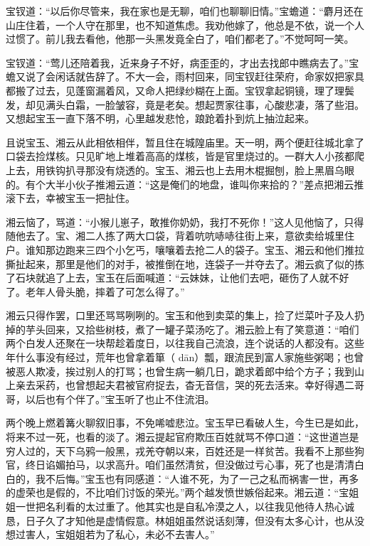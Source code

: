 \documentclass[12pt,oneside]{book}
\begin{document}
宝钗道：“以后你尽管来，我在家也是无聊，咱们也聊聊旧情。”宝蟾道：“麝月还在山庄住着，一个人守在那里，也不知道焦虑。我劝他嫁了，他总是不依，说一个人过惯了。前儿我去看他，他那一头黑发竟全白了，咱们都老了。”不觉呵呵一笑。

宝钗道：“莺儿还陪着我，近来身子不好，病歪歪的，才出去找郎中瞧病去了。”宝蟾又说了会闲话就告辞了。不大一会，雨村回来，同宝钗赶往荣府，命家奴把家具都搬了过去，见蓬窗漏着风，又命人把绿纱糊在上面。宝钗拿起铜镜，理了理鬓发，却见满头白霜，一脸皱容，竟是老矣。想起贾家往事，心酸悲凄，落了些泪。又想起宝玉一直下落不明，心里越发悲怆，踉跄着扑到炕上抽泣起来。

且说宝玉、湘云从此相依相伴，暂且住在城隍庙里。天一明，两个便赶往城北拿了口袋去捡煤核。只见旷地上堆着高高的煤核，皆是官里烧过的。一群大人小孩都爬上去，用铁钩扒寻那没有烧透的。宝玉、湘云也上去用木棍掘刨，脸上黑眉乌眼的。有个大半小伙子推湘云道：“这是俺们的地盘，谁叫你来拾的？”差点把湘云推滚下去，幸被宝玉一把扯住。

湘云恼了，骂道：“小猴儿崽子，敢推你奶奶，我打不死你！”这人见他恼了，只得随他去了。宝、湘二人拣了两大口袋，背着吭吭哧哧往街上来，意欲卖给城里住户。谁知那边跑来三四个小乞丐，嚷嚷着去抢二人的袋子。宝玉、湘云和他们推拉撕扯起来，那里是他们的对手，被推倒在地，连袋子一并夺去了。湘云疯了似的拣了石块就追了上去，宝玉在后面喊道：“云妹妹，让他们去吧，砸伤了人就不好了。老年人骨头脆，摔着了可怎么得了。”

湘云只得作罢，口里还骂骂咧咧的。宝玉和他到卖菜的集上，捡了烂菜叶子及人扔掉的芋头回来，又拾些树枝，煮了一罐子菜汤吃了。湘云脸上有了笑意道：“咱们两个白发人还聚在一块帮趁着度日，以往我自己流浪，连个说话的人都没有。这些年什么事没有经过，荒年也曾拿着箪（ dān）瓢，跟流民到富人家施些粥喝；也曾被恶人欺凌，挨过别人的打骂；也曾生病一躺几日，跪求着郎中给个方子；我到山上亲去采药，也曾想起夫君被官府捉去，杳无音信，哭的死去活来。幸好得遇二哥哥，以后也有个伴了。”宝玉听了也止不住流泪。

两个晚上燃着篝火聊叙旧事，不免唏嘘悲泣。宝玉早已看破人生，今生已是如此，将来不过一死，也看的淡了。湘云提起官府欺压百姓就骂不停口道：“这世道岂是穷人过的，天下乌鸦一般黑，戎羌夺朝以来，百姓还是一样贫苦。我看不上那些狗官，终日谄媚拍马，以求高升。咱们虽然清贫，但没做过亏心事，死了也是清清白白的，我不后悔。”宝玉也有同感道：“人谁不死，为了一己之私而祸害一世，再多的虚荣也是假的，不比咱们讨饭的荣光。”两个越发愤世嫉俗起来。湘云道：“宝姐姐一世把名利看的太过重了。他其实也是自私冷漠之人，以往我见他待人热心诚恳，日子久了才知他是虚情假意。林姐姐虽然说话刻薄，但没有太多心计，也从没想过害人，宝姐姐若为了私心，未必不去害人。”
\end{document}
